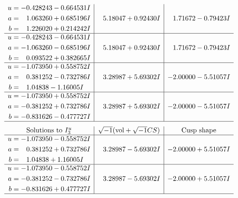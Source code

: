 \documentclass[1p]{elsarticle_modified}
\theoremstyle{definition}
\newcommand{\I}{\sqrt{-1}}
\begin{document}
$$\begin{array}{c|c|c}
\begin{aligned}
u &= -0.428243 - 0.664531 I \\
a &= \phantom{-}1.063260 + 0.685196 I \\
b &= \phantom{-}1.226020 + 0.214242 I\end{aligned}
 & \phantom{-}5.18047 + 0.92430 I & \phantom{-}1.71672 - 0.79423 I \\ \hline\begin{aligned}
u &= -0.428243 - 0.664531 I \\
a &= -1.063260 - 0.685196 I \\
b &= \phantom{-}0.093522 + 0.382665 I\end{aligned}
 & \phantom{-}5.18047 + 0.92430 I & \phantom{-}1.71672 - 0.79423 I \\ \hline\begin{aligned}
u &= -1.073950 + 0.558752 I \\
a &= \phantom{-}0.381252 - 0.732786 I \\
b &= \phantom{-}1.04838 - 1.16005 I\end{aligned}
 & \phantom{-}3.28987 + 5.69302 I & -2.00000 - 5.51057 I \\ \hline\begin{aligned}
u &= -1.073950 + 0.558752 I \\
a &= -0.381252 + 0.732786 I \\
b &= -0.831626 - 0.477727 I\end{aligned}
 & \phantom{-}3.28987 + 5.69302 I & -2.00000 - 5.51057 I\\
 \hline 
 \end{array}$$\newpage$$\begin{array}{c|c|c}  
\text{Solutions to }I^u_{3}& \I (\text{vol} + \sqrt{-1}CS) & \text{Cusp shape}\\
 \hline 
\begin{aligned}
u &= -1.073950 - 0.558752 I \\
a &= \phantom{-}0.381252 + 0.732786 I \\
b &= \phantom{-}1.04838 + 1.16005 I\end{aligned}
 & \phantom{-}3.28987 - 5.69302 I & -2.00000 + 5.51057 I \\ \hline\begin{aligned}
u &= -1.073950 - 0.558752 I \\
a &= -0.381252 - 0.732786 I \\
b &= -0.831626 + 0.477727 I\end{aligned}
 & \phantom{-}3.28987 - 5.69302 I & -2.00000 + 5.51057 I\\
 \hline 
 \end{array}$$\newpage\newpage\renewcommand{\arraystretch}{1}
\end{document}
